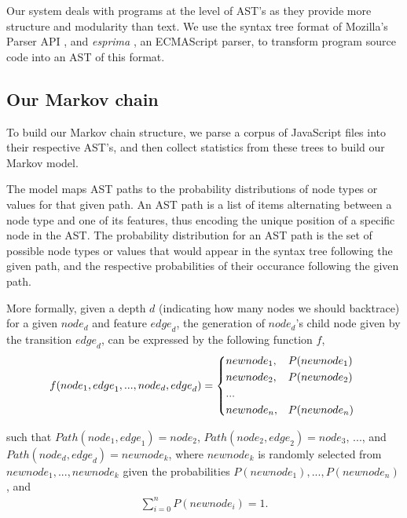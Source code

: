 \documentclass{article}
\begin{document}
Our system deals with programs at the level of AST's as they provide more structure and modularity than text.
We use the syntax tree format of Mozilla's Parser API \cite{parser api}, and \emph{esprima} \cite{esprima}, an ECMAScript
parser, to transform program source code into an AST of this format.


\subsection{Our Markov chain}

To build our Markov chain structure, we parse a corpus of JavaScript files into their
respective AST's, and then collect statistics from these trees to build our Markov model. 

The model maps AST paths to the probability distributions of node types or values for that given
path. An AST path is a list of items alternating between a node type and one of its features, thus encoding the unique position of a 
specific node in the AST. The probability distribution for an AST path is the set of possible node types or values that would appear in the
syntax tree following the given path, and the respective probabilities of their
occurance following the given path.

More formally, given a depth $d$ (indicating how many nodes we should backtrace) for a given
${node}_d$ and feature ${edge}_d$, the generation of ${node}_d$'s child node given by the
transition ${edge}_d$, can be expressed by the following function $f$, \begin{align*}
f({node}_1, {edge}_1, ..., {node}_{d}, {edge}_{d}) = \begin{dcases*}
		{newnode_1},	&	$P({newnode_1})$ \\
		{newnode_2},	&	$P({newnode_2})$ \\
		...\\
		{newnode_n},    &   $P({newnode_n})$ \\
	\end{dcases*}
\end{align*}

such that ${Path}({node}_1, {edge}_1) = {node}_2$, ${Path}({node}_2, {edge}_2) = {node}_3$, ..., and ${Path}({node}_d, {edge}_d) = {newnode}_k$, where ${newnode}_k$ is randomly selected from ${newnode}_1, ..., {newnode}_k$ given the probabilities $P({newnode_1}), ..., P({newnode_n})$, and \begin{align*}
\sum\limits_{i = 0}^n P({newnode_i}) = 1.
\end{align*}
\end{document}
